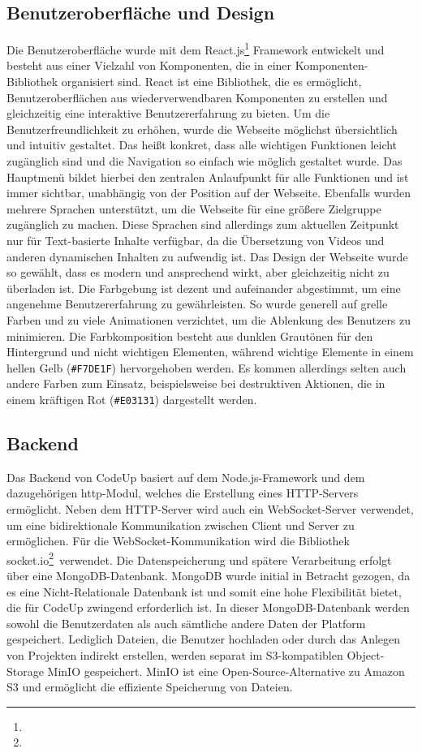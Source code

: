 \documentclass[main.tex]{subfiles}
\begin{document}
    \subsection{Benutzeroberfläche und Design}
    Die Benutzeroberfläche wurde mit dem React.js\footnote{} Framework entwickelt und besteht aus einer Vielzahl von Komponenten, die in einer Komponenten-Bibliothek organisiert sind.
    React ist eine Bibliothek, die es ermöglicht, Benutzeroberflächen aus wiederverwendbaren Komponenten zu erstellen und gleichzeitig eine interaktive Benutzererfahrung zu bieten.
    Um die Benutzerfreundlichkeit zu erhöhen, wurde die Webseite möglichst übersichtlich und intuitiv gestaltet.
    Das heißt konkret, dass alle wichtigen Funktionen leicht zugänglich sind und die Navigation so einfach wie möglich gestaltet wurde.
    Das Hauptmenü bildet hierbei den zentralen Anlaufpunkt für alle Funktionen und ist immer sichtbar, unabhängig von der Position auf der Webseite.
    Ebenfalls wurden mehrere Sprachen unterstützt, um die Webseite für eine größere Zielgruppe zugänglich zu machen.
    Diese Sprachen sind allerdings zum aktuellen Zeitpunkt nur für Text-basierte Inhalte verfügbar, da die Übersetzung von Videos und anderen dynamischen Inhalten zu aufwendig ist.
    Das Design der Webseite wurde so gewählt, dass es modern und ansprechend wirkt, aber gleichzeitig nicht zu überladen ist.
    Die Farbgebung ist dezent und aufeinander abgestimmt, um eine angenehme Benutzererfahrung zu gewährleisten.
    So wurde generell auf grelle Farben und zu viele Animationen verzichtet, um die Ablenkung des Benutzers zu minimieren.
    Die Farbkomposition besteht aus dunklen Grautönen für den Hintergrund und nicht wichtigen Elementen, während wichtige Elemente in einem hellen Gelb ({\color{cyellow}\texttt{\#F7DE1F}}) hervorgehoben werden.
    Es kommen allerdings selten auch andere Farben zum Einsatz, beispielsweise bei destruktiven Aktionen, die in einem kräftigen Rot ({\color{cred}\texttt{\#E03131}}) dargestellt werden.

    \subsection{Backend}
    Das Backend von CodeUp basiert auf dem Node.js-Framework und dem dazugehörigen \dq http\dq-Modul, welches die Erstellung eines HTTP-Servers ermöglicht.
    Neben dem HTTP-Server wird auch ein WebSocket-Server verwendet, um eine bidirektionale Kommunikation zwischen Client und Server zu ermöglichen.
    Für die WebSocket-Kommunikation wird die Bibliothek \dq socket.io\dq \footnote{}\ verwendet.
    Die Datenspeicherung und spätere Verarbeitung erfolgt über eine MongoDB-Datenbank.
    MongoDB wurde initial in Betracht gezogen, da es eine Nicht-Relationale Datenbank ist und somit eine hohe Flexibilität bietet, die für CodeUp zwingend erforderlich ist.
    In dieser MongoDB-Datenbank werden sowohl die Benutzerdaten als auch sämtliche andere Daten der Platform gespeichert.
    Lediglich Dateien, die Benutzer hochladen oder durch das Anlegen von Projekten indirekt erstellen, werden separat im S3-kompatiblen Object-Storage MinIO gespeichert.
    MinIO ist eine Open-Source-Alternative zu Amazon S3 und ermöglicht die effiziente Speicherung von Dateien.
\end{document}
